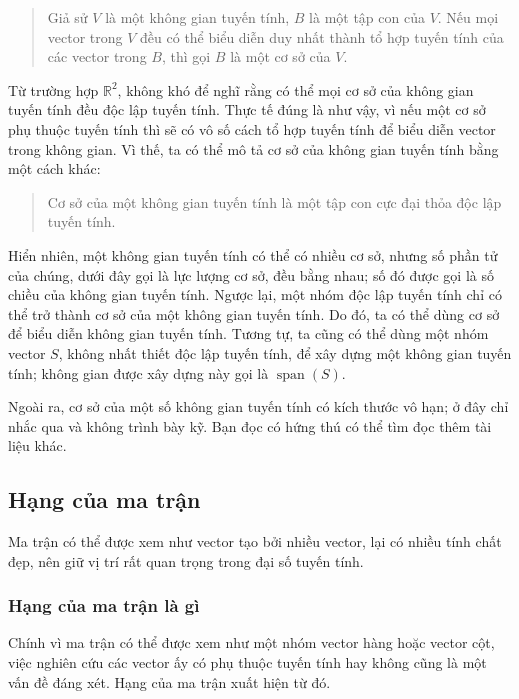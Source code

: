 \documentclass[11pt]{article}
\begin{document}
\begin{quote}
Giả sử \(V\) là một không gian tuyến tính, \(B\) là một tập con của \(V\). Nếu
mọi vector trong \(V\) đều có thể biểu diễn duy nhất thành tổ hợp tuyến tính của
các vector trong \(B\), thì gọi \(B\) là một cơ sở của \(V\).
\end{quote}

Từ trường hợp \(\mathbb{R}^2\), không khó để nghĩ rằng có thể mọi cơ sở của
không gian tuyến tính đều độc lập tuyến tính. Thực tế đúng là như vậy, vì nếu
một cơ sở phụ thuộc tuyến tính thì sẽ có vô số cách tổ hợp tuyến tính để biểu
diễn vector trong không gian. Vì thế, ta có thể mô tả cơ sở của không gian tuyến
tính bằng một cách khác:

\begin{quote}
Cơ sở của một không gian tuyến tính là một tập con cực đại thỏa độc lập tuyến
tính.
\end{quote}

Hiển nhiên, một không gian tuyến tính có thể có nhiều cơ sở, nhưng số phần tử của
chúng, dưới đây gọi là lực lượng cơ sở, đều bằng nhau; số đó được gọi là số
chiều của không gian tuyến tính. Ngược lại, một nhóm độc lập tuyến tính chỉ có
thể trở thành cơ sở của một không gian tuyến tính. Do đó, ta có thể dùng cơ sở
để biểu diễn không gian tuyến tính. Tương tự, ta cũng có thể dùng một nhóm vector
\(S\), không nhất thiết độc lập tuyến tính, để xây dựng một không gian tuyến
tính; không gian được xây dựng này gọi là \(\operatorname{span}(S)\).

Ngoài ra, cơ sở của một số không gian tuyến tính có kích thước vô hạn; ở đây chỉ
nhắc qua và không trình bày kỹ. Bạn đọc có hứng thú có thể tìm đọc thêm tài
liệu khác.

\subsection{Hạng của ma trận}

Ma trận có thể được xem như vector tạo bởi nhiều vector, lại có nhiều tính chất
đẹp, nên giữ vị trí rất quan trọng trong đại số tuyến tính.

\subsubsection{Hạng của ma trận là gì}

Chính vì ma trận có thể được xem như một nhóm vector hàng hoặc vector cột, việc
nghiên cứu các vector ấy có phụ thuộc tuyến tính hay không cũng là một vấn đề
đáng xét. Hạng của ma trận xuất hiện từ đó.
\end{document}
